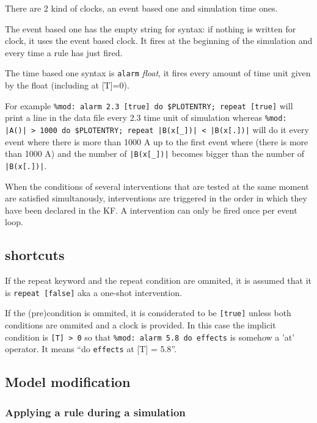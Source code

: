\documentclass[11pt]{book}
\def\ttt#1{\texttt{#1}}
\begin{document}
There are 2 kind of clocks, an event based one and simulation time ones.

The event based one has the empty string for syntax: if nothing is
written for clock, it uses the event based clock. It fires at the
beginning of the simulation and every time a rule has just fired.

The time based one syntax is \ttt{alarm} \textit{float}, it fires
every amount of time unit given by the float (including at [T]=0).

For example
\lstinline[language=kappa]@%mod: alarm 2.3 [true] do $PLOTENTRY; repeat [true]@
will print a line in the data file every 2.3 time unit of
simulation whereas
\lstinline[language=kappa]@%mod: |A()| > 1000 do $PLOTENTRY; repeat |B(x[_])| < |B(x[.])|@
will do it every event where there is more than
1000 A up to the first event where (there is more than 1000 A) and
the number of \lstinline[language=kappa]@|B(x[_])|@ becomes bigger than the number of
\lstinline[language=kappa]@|B(x[.])|@.

When the conditions of several interventions that are tested at the
same moment are satisfied simultanously, interventions are triggered
in the order in which they have been declared in the KF. A intervention can only be fired once per event loop.

\subsection{shortcuts}
If the repeat keyword and the repeat condition are ommited, it is assumed that it is
\lstinline[language=kappa]!repeat [false]! aka a one-shot intervention.

If the (pre)condition is ommited, it is considerated to be
\lstinline[language=kappa]![true]! unless both conditions are ommited
and a clock is provided. In this case the implicit condition is
\lstinline[language=kappa]![T] > 0! so that
\lstinline[language=kappa]!%mod: alarm 5.8 do effects!
is somehow a 'at' operator. It means ``do \texttt{effects} at [T] = 5.8''.

\subsection{Model modification}
\subsubsection{Applying a rule during a simulation}
\end{document}
